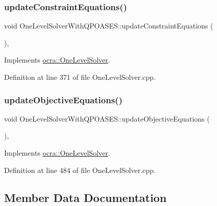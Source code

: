 \subsubsection{\texorpdfstring{update\+Constraint\+Equations()}{updateConstraintEquations()}}
{\footnotesize\ttfamily void One\+Level\+Solver\+With\+Q\+P\+O\+A\+S\+E\+S\+::update\+Constraint\+Equations (\begin{DoxyParamCaption}{ }\end{DoxyParamCaption})\hspace{0.3cm}{\ttfamily [protected]}, {\ttfamily [virtual]}}



Implements \hyperlink{classocra_1_1OneLevelSolver_af592dc713af6cf22e67abcdfba09ca5e}{ocra\+::\+One\+Level\+Solver}.



Definition at line 371 of file One\+Level\+Solver.\+cpp.

\hypertarget{classocra_1_1OneLevelSolverWithQPOASES_a6a0e2cdfe22731fde09af26442a9cc85}{}\label{classocra_1_1OneLevelSolverWithQPOASES_a6a0e2cdfe22731fde09af26442a9cc85} 
\subsubsection{\texorpdfstring{update\+Objective\+Equations()}{updateObjectiveEquations()}}
{\footnotesize\ttfamily void One\+Level\+Solver\+With\+Q\+P\+O\+A\+S\+E\+S\+::update\+Objective\+Equations (\begin{DoxyParamCaption}{ }\end{DoxyParamCaption})\hspace{0.3cm}{\ttfamily [protected]}, {\ttfamily [virtual]}}



Implements \hyperlink{classocra_1_1OneLevelSolver_a150b377a35e30ae9c347147c10fddb33}{ocra\+::\+One\+Level\+Solver}.



Definition at line 484 of file One\+Level\+Solver.\+cpp.



\subsection{Member Data Documentation}
\hypertarget{classocra_1_1OneLevelSolverWithQPOASES_ae427c9c48cc3538994f0c2b6b06da7d6}{}\label{classocra_1_1OneLevelSolverWithQPOASES_ae427c9c48cc3538994f0c2b6b06da7d6} 
